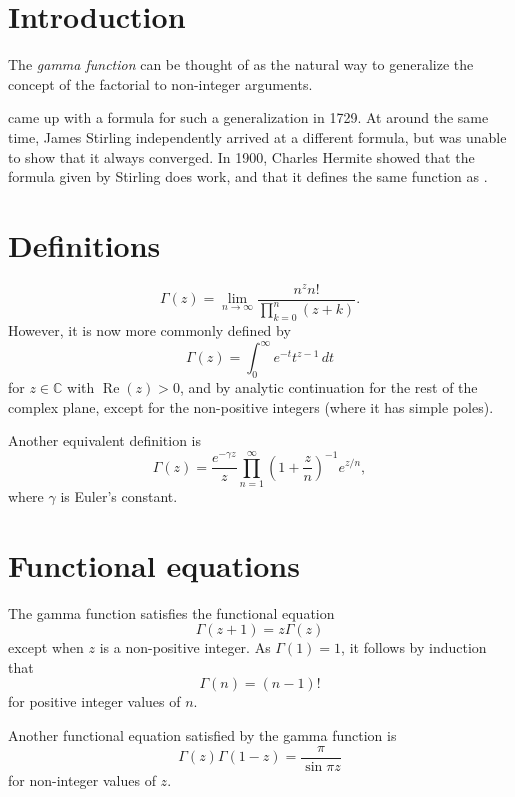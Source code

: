 \documentclass{article}
\def\C{\mathbb{C}}
\def\Re{\operatorname{Re}}
\begin{document}

\section*{Introduction}

The \emph{gamma function} can be thought of as
the natural way to generalize the concept of the factorial
to non-integer arguments.

came up with a formula for such a generalization in 1729.
At around the same time,
James Stirling independently arrived at a different formula,
but was unable to show that it always converged.
In 1900, Charles Hermite showed that the formula given by Stirling does work,
and that it defines the same function as .

\section*{Definitions}

\[
  \Gamma(z) = \lim_{n\to\infty}\frac{n^z n!}{\prod_{k=0}^n(z+k)}.
\]
However, it is now more commonly defined by
\[
  \Gamma(z) = \int_0^\infty \! e^{-t} t^{z-1} \, dt
\]
for $z\in\C$ with $\Re(z)>0$,
and by analytic continuation for the rest of the complex plane,
except for the non-positive integers (where it has simple poles).

Another equivalent definition is
\[
  \Gamma(z) = \frac{e^{-\gamma z}}{z}
  \prod_{n=1}^\infty \left(1 + \frac{z}{n}\right)^{-1} e^{z/n},
\]
where $\gamma$ is Euler's constant.

\section*{Functional equations}

The gamma function satisfies the functional equation
\[
  \Gamma(z+1) = z \Gamma(z)
\]
except when $z$ is a non-positive integer.
As $\Gamma(1)=1$, it follows by induction that
\[
  \Gamma(n) = (n-1)!
\]
for positive integer values of $n$.

Another functional equation satisfied by the gamma function is
\[
  \Gamma(z) \Gamma(1-z) = \frac{\pi}{\sin \pi z}
\]
for non-integer values of $z$.
\end{document}
